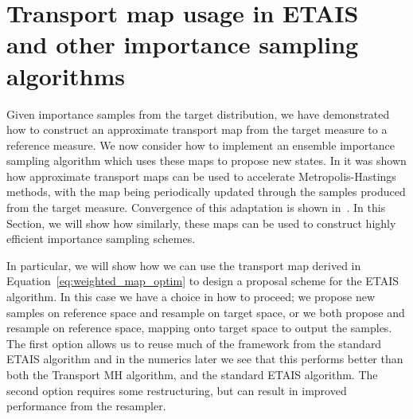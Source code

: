 \documentclass[final]{siamltex}
\begin{document}
\section[Transport map MCMC]{Transport map usage in ETAIS
  and other importance sampling algorithms}\label{sec:TETAIS}

Given importance samples from the target distribution, we have demonstrated how to construct an approximate transport map from the
target measure to a reference measure. We now consider how to
implement an ensemble importance sampling algorithm which uses
these maps to propose new states. In \cite{parno2018transport} it was
shown how approximate transport maps can be used to accelerate
Metropolis-Hastings methods, with the map being periodically updated
through the samples produced from the target measure. Convergence of this
adaptation is shown in~\cite{parno2018transport}. In this Section, we
will show how similarly, these maps can be used to construct highly
efficient importance sampling schemes.

In particular, we will show how we can use the transport map derived in Equation~\eqref{eq:weighted_map_optim} to
design a proposal scheme for the ETAIS algorithm. In this case we have a choice in how to proceed; we
propose new samples on reference space and resample on target space, or we both propose and resample on reference space, mapping onto target space to output the samples. The first option allows us to reuse much of the framework
from the standard ETAIS algorithm and in the numerics later we see that this performs better than
both the Transport MH algorithm, and the standard ETAIS algorithm. The second option requires some
restructuring, but can result in improved performance from the resampler.

\end{document}

